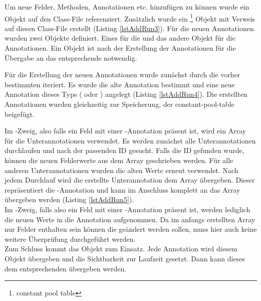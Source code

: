 Um neue Felder, Methoden, Annotationen etc. hinzuf\"ugen zu k\"onnen wurde ein  Objekt auf den  Class-File referenziert. Zus\"atzlich wurde ein \footnote{constant pool table} Objekt mit Verweis auf diesen Class-File erstellt (Listing \ref{lstAddRun3}). 
Für die neuen Annotationen wurden zwei  Objekte definiert. Eines f\"ur die  und das andere Objekt f\"ur die  Annotationen. Ein  Objekt ist nach der Erstellung der Annotationen f\"ur die \"Ubergabe an das entsprechende  notwendig. 

\begin{figure}[!htb]
	
\end{figure}

F\"ur die Erstellung der neuen Annotationen wurde zun\"achst durch die vorher bestimmten  iteriert. Es wurde die alte Annotation bestimmt und eine neue Annotation dieses Typs ( oder ) angelegt (Listing \ref{lstAddRun4}). Die erstellten Annotationen wurden gleichzeitig zur Speicherung, der constant-pool-table beigef\"ugt. 

\begin{figure}[!htb]
	
\end{figure}

Im -Zweig, also falls ein Feld mit einer -Annotation pr\"asent ist, wird ein  Array f\"ur die Unterannotationen verwendet. Es werden zun\"achst alle Unterannotationen durchlaufen und nach der passenden ID gesucht. Falls die ID gefunden wurde, können die neuen Fehlerwerte aus dem  Array geschrieben werden. F\"ur alle anderen Unterannotationen wurden die alten Werte erneut verwendet. Nach jedem Durchlauf wird die erstellte Unterannotation dem  Array \"ubergeben. Dieser repr\"asentiert die -Annotation und kann im Anschluss komplett an das  Array übergeben werden (Listing \ref{lstAddRun5}).  \\
Im -Zweig, falls also ein Feld mit einer -Annotation pr\"asent ist, werden lediglich die neuen Werte in die Annotation aufgenommen. Da im anfangs erstellten  Array nur Felder enthalten sein k\"onnen die ge\"andert werden sollen, muss hier auch keine weitere \"Uberpr\"ufung durchgef\"uhrt werden.\\
Zum Schluss kommt das  Objekt zum Einsatz. Jede Annotation wird diesem Objekt \"ubergeben und die Sichtbarkeit zur Laufzeit gesetzt. Dann kann dieses dem entsprechenden  \"ubergeben werden.

